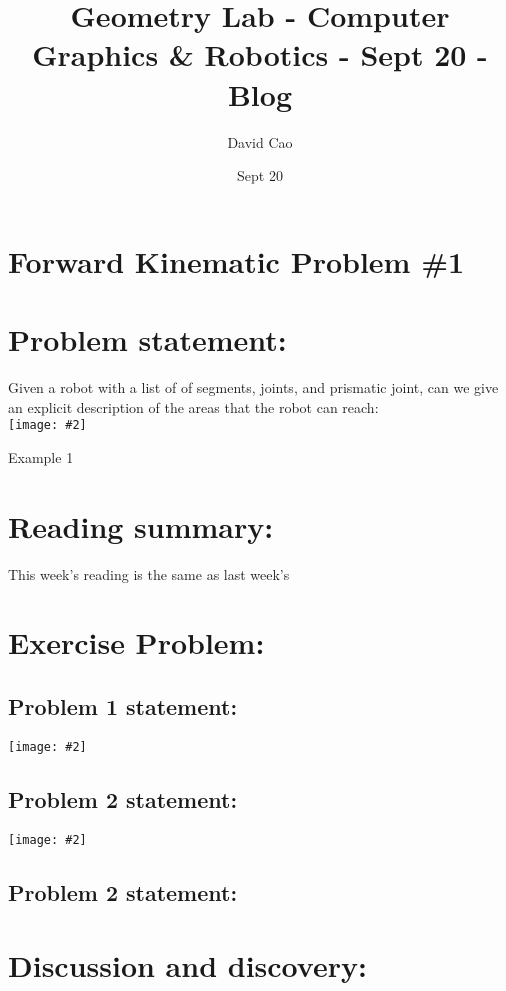 \documentclass[11pt]{article}
\title{Geometry Lab - Computer Graphics \& Robotics - Sept 20 - Blog}
\author{David Cao}
\date{Sept 20}
\newcommand{\image}[2]{\texttt{[image: \#2]}}
\begin{document}
\maketitle

\section*{Forward Kinematic Problem \#1}
\section{Problem statement:}
Given a robot with a list of of segments, joints, and prismatic joint, can we give an explicit description of the areas that the robot can reach:
\vspace{3em} \\
\image{0.75}{img1}\\
\begin{center}
  Example 1
\end{center}

\section{Reading summary:}
This week's reading is the same as last week's
\section{Exercise Problem:}
\subsection{Problem 1 statement:}
\image{0.5}{img2}
\subsection{Problem 2 statement:}
\image{0.5}{img3}
\subsection*{Problem 2 statement:}
\section{Discussion and discovery:}
\end{document}
